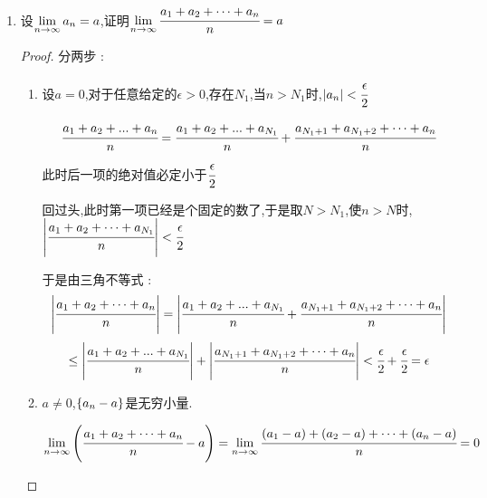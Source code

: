 {{{{\begin{enumerate}
{\begin{proof}
                      取$N = max\set{\mediumBigCase{\cfrac{4}{\epsilon}},6}$,当$n > N$,$\absoluteValue{\cfrac{n^2}{2n^2 - 7n} - \cfrac{1}{2}} = \absoluteValue{\cfrac{7n + 2}{2n(2n - 7)}} < \cfrac{4}{n} < \epsilon$

                  \end{proof}
                  }
            \item {
                  设$\lim\limits_{n \to \infty}a_n = a$,证明$\lim\limits_{n \to \infty}\cfrac{a_1 + a_2 + \dots + a_n}{n} = a$

                  \begin{proof}
                      分两步 :

                      \begin{enumerate}
                          \item {
                                设$a = 0$,对于任意给定的$\epsilon > 0$,存在$N_1$,当$n > N_1$时,$\left\lvert a_n \right\vert < \cfrac{\epsilon}{2}$

                                $$
                                    \cfrac{a_1 + a_2 + ... + a_n}{n} = \cfrac{a_1 + a_2 + ... + a_{N_1}}{n} + \cfrac{a_{N_1 + 1} + a_{N_1 + 2} + \dots + a_n}{n}
                                $$
                                此时后一项的绝对值必定小于$\cfrac{\epsilon}{2}$

                                回过头,此时第一项已经是个固定的数了,于是取$N > N_1$,使$n > N$时,$\left\lvert \cfrac{a_1 + a_2 + \dots + a_{N_1}}{n} \right\vert < \cfrac{\epsilon}{2}$

                                于是由三角不等式 : $$
                                    \left\lvert \cfrac{a_1 + a_2 + \dots + a_n}{n} \right\vert = \left\lvert \cfrac{a_1 + a_2 + ... + a_{N_1}}{n} + \cfrac{a_{N_1 + 1} + a_{N_1 + 2} + \dots + a_n}{n} \right\vert
                                $$
                                $$
                                    \leq \left\lvert \cfrac{a_1 + a_2 + ... + a_{N_1}}{n} \right\vert + \left\lvert \cfrac{a_{N_1 + 1} + a_{N_1 + 2} + \dots + a_n}{n} \right\vert < \cfrac{\epsilon}{2} + \cfrac{\epsilon}{2} = \epsilon
                                $$
                                }
                          \item {
                                $a \neq 0$,$\left\{ a_n - a \right\}$是无穷小量.

                                $$
                                    \lim\limits_{n \to \infty}\left(\cfrac{a_1 + a_2 + \dots + a_n}{n} - a\right) = \lim\limits_{n \to \infty}\cfrac{(a_1 - a) + (a_2 - a) + \dots + (a_n - a)}{n} = 0
                                $$
                                }
                      \end{enumerate}


\end{proof}}
\end{enumerate}}}}}

